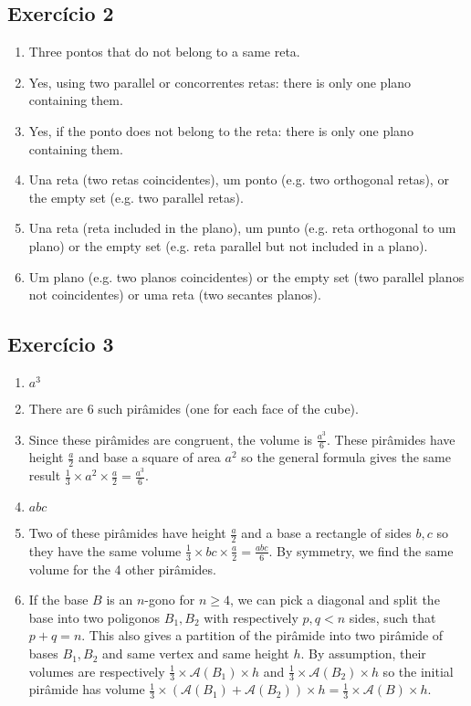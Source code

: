 \subsection*{Exercício 2}

\begin{enumerate}
\item Three pontos that do not belong to a same reta.
\item Yes, using two parallel or concorrentes retas:
  there is only one plano containing them.
\item Yes, if the ponto does not belong to the reta: there is only one plano
  containing them.
\item Una reta (two retas coincidentes), um ponto (e.g. two orthogonal retas),
  or the empty set (e.g. two parallel retas).
\item Una reta (reta included in the plano), um punto
  (e.g. reta orthogonal to um plano) or the empty set (e.g. reta parallel
  but not included in a plano).
\item  Um plano (e.g. two planos coincidentes) or the empty set
  (two parallel planos not coincidentes) or uma reta (two secantes planos).
\end{enumerate}

\subsection*{Exercício 3}

\begin{enumerate}
\item $a^3$
\item There are $6$ such pirâmides (one for each face of the cube).
\item Since these pirâmides are congruent, the volume is
  $\frac{a^3}{6}$. These pirâmides have height $\frac{a}{2}$
  and base a square of area $a^2$ so the general formula gives the same result
  $\frac{1}{3} \times a^2 \times \frac{a}{2} = \frac{a^3}{6}$.
\item $abc$
\item Two of these pirâmides have height $\frac{a}{2}$ and a base a rectangle of
  sides $b,c$ so they have the same volume
  $\frac{1}{3} \times {bc} \times \frac{a}{2} = \frac{abc}{6}$. By symmetry,
  we find the same volume for the 4 other pirâmides.
\item If the base $B$ is an $n$-gono for $n \geq 4$, we can pick a diagonal and
  split the base into two poligonos $B_1, B_2$
  with respectively $p,q < n$ sides, such that $p+q = n$.
  This also gives a partition of the pirâmide into two pirâmide of bases
  $B_1, B_2$ and same vertex and same height $h$.
  By assumption, their volumes are respectively
  $\frac{1}{3} \times {\mathscr{A}(B_1)} \times h$ and
  $\frac{1}{3} \times {\mathscr{A}(B_2)} \times h$ so the initial pirâmide has volume
  $\frac{1}{3} \times {\left({\mathscr{A}(B_1)} + {\mathscr{A}(B_2)}\right)}
  \times h = \frac{1}{3} \times {\mathscr{A}(B)} \times h$.
\end{enumerate}


